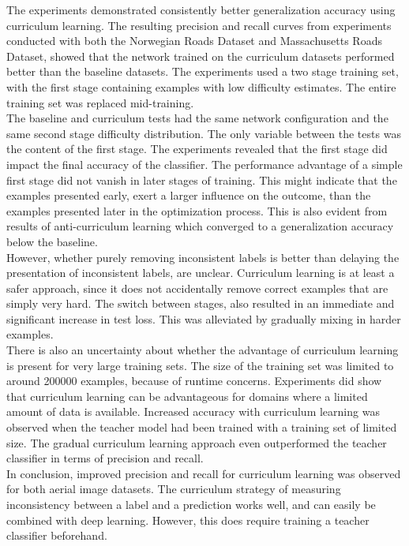 The experiments demonstrated consistently better generalization accuracy using curriculum learning. The resulting precision and recall curves from experiments conducted with both the Norwegian Roads Dataset and Massachusetts Roads Dataset, showed that the network trained on the curriculum datasets performed better than the baseline datasets. The experiments used a two stage training set, with the first stage containing examples with low difficulty estimates. The entire training set was replaced mid-training. \\

The baseline and curriculum tests had the same network configuration and the same second stage difficulty distribution. The only variable between the tests was the content of the first stage. The experiments revealed that the first stage did impact the final accuracy of the classifier. The performance advantage of a simple first stage did not vanish in later stages of training. This might indicate that the examples presented early, exert a larger influence on the outcome, than the examples presented later in the optimization process. This is also evident from results of anti-curriculum learning which converged to a generalization accuracy below the baseline. \\

However, whether purely removing inconsistent labels is  better than delaying the presentation of inconsistent labels, are  unclear. Curriculum learning is at least a safer approach, since it does not accidentally remove correct examples that are simply very hard. The switch between stages, also resulted in an immediate and significant increase in test loss. This was alleviated by gradually mixing in harder examples.\\

There is also an uncertainty about whether the advantage of curriculum learning is present for very large training sets. The size of the training set was limited to around 200000 examples, because of runtime concerns. Experiments did show that curriculum learning can be advantageous for domains where a limited amount of data is available. Increased accuracy with curriculum learning was observed when the teacher model had been trained with a training set of limited size. The gradual curriculum learning approach even outperformed the teacher classifier in terms of precision and recall.\\

In conclusion, improved precision and recall for curriculum learning was observed for both aerial image datasets. The curriculum strategy of measuring inconsistency between a label and a prediction works well, and can easily be combined with deep learning. However, this does  require training a teacher classifier beforehand.


